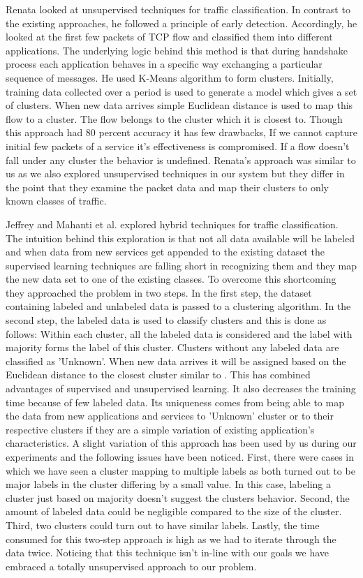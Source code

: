 Renata\cite{bernaille2006traffic} looked at unsupervised techniques for traffic classification. In contrast to the existing approaches, he followed a principle of early detection. Accordingly, he looked at the first few packets of TCP flow and classified them into different applications. The underlying logic behind this method is that during handshake process each application behaves in a specific way exchanging a particular sequence of messages. 
He used K-Means algorithm to form clusters. Initially, training data collected over a period  is used to generate a model which gives a set of clusters. When new data arrives simple Euclidean distance is used to map this flow to a cluster. The flow belongs to the cluster which it is closest to. Though this approach had 80 percent accuracy it has few drawbacks, If we cannot capture initial few packets of a service it's effectiveness is compromised. If a flow doesn't fall under any cluster the behavior is undefined.
Renata's \cite{bernaille2006traffic} approach was similar to us as we also explored unsupervised techniques in our system but they differ in the point that they examine the packet data and map their clusters to only known classes of traffic.

Jeffrey and Mahanti et al. \cite{erman2007semi} explored hybrid techniques for traffic classification. The intuition behind this exploration is that not all data available will be labeled and when data from new services get appended to the existing dataset the supervised learning techniques are falling short in recognizing them and they map the new data set to one of the existing classes. To overcome this shortcoming they approached the problem in two steps. In the first step, the dataset containing labeled and unlabeled data is passed to a clustering algorithm. In the second step, the labeled data is used to classify clusters and this is done as follows: Within each cluster, all the labeled data is considered and the label with majority forms the label of this cluster. Clusters without any labeled data are classified as 'Unknown'. When new data arrives it will be assigned based on the Euclidean distance to the closest cluster similar to \cite{bernaille2006traffic}. This has combined advantages of supervised and unsupervised learning. It also decreases the training time because of few labeled data. Its uniqueness comes from being able to map the data from new applications and services to 'Unknown' cluster or to their respective clusters if they are a simple variation of existing application's characteristics. A  slight variation of this approach has been used by us during our experiments and the following issues have been noticed. First, there were cases in which we have seen a cluster mapping to multiple labels as both turned out to be major labels in the cluster differing by a small value. In this case, labeling a cluster just based on majority doesn't suggest the clusters behavior. Second, the amount  of labeled data could be negligible compared to the size of the cluster. Third, two clusters could turn out to have similar labels. Lastly, the time consumed for this two-step approach is high as we had to iterate through the data twice. Noticing that this technique isn't in-line with  our goals we have embraced a totally unsupervised approach to our problem.


